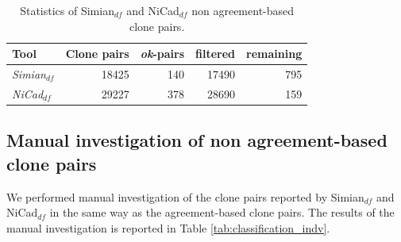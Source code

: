 \documentclass{sig-alternate-05-2015}
\begin{document}
\begin{table}
	\centering
	\caption{Statistics of Simian$_{df}$ and NiCad$_{df}$ non agreement-based clone pairs.}
	\label{tab:classification_indv_stats}
	\small
	\begin{tabular}{l|r|r|r|r}
		\hline 
		Tool & Clone pairs & \textit{ok}-pairs & filtered & remaining \\ 
		\hline
		\multirow{1}{*}{\textit{Simian$_{df}$}} & 18425 & 140 & 17490 & 795 \\
		\hline
		\multirow{1}{*}{\textit{NiCad$_{df}$}} & 29227  & 378 & 28690 & 159 \\
		\hline
	\end{tabular} 
\end{table}

\subsection{Manual investigation of non agreement-based clone pairs}
We performed manual investigation of the clone pairs reported by Simian$_{df}$ and NiCad$_{df}$ in the same way as the agreement-based clone pairs. The results of the manual investigation is reported in Table \ref{tab:classification_indv}.
\end{document}
